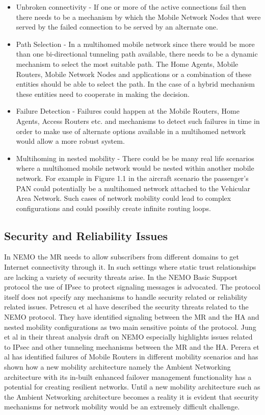 \begin{itemize}
\item Unbroken connectivity - If one or more of the active connections fail
then there needs to be a mechanism by which the Mobile Network Nodes that were
served by the failed connection to be served by an alternate one.

\item Path Selection - In a multihomed mobile network since there would be
more than one bi-directional tunneling path available, there needs to be a
dynamic mechanism to select the most suitable path. The Home Agents, Mobile
Routers, Mobile Network Nodes and applications or a combination of these
entities should be able to select the path. In the case of a hybrid mechanism
these entities need to cooperate in making the decision.

\item Failure Detection - Failures could happen at the Mobile Routers, Home
Agents, Access Routers etc. and mechanisms to detect such
failures in time in order to make use of alternate options available in a
multihomed network would allow a more robust system.

\item Multihoming in nested mobility - There could be be many real life
scenarios where a multihomed mobile network would be nested within another
mobile network. For example in Figure 1.1 in the aircraft scenario the passenger's
PAN could potentially be a multihomed network attached to the Vehicular Area Network. Such cases of network mobility could lead to complex configurations and could possibly create infinite routing loops.
\end{itemize}

\subsection{Security and Reliability Issues}

In NEMO the MR needs to allow subscribers from different domains to get
Internet connectivity through it. In such settings where static trust
relationships are lacking a variety of security threats arise. In the NEMO
Basic Support protocol the use of IPsec to protect signaling messages is
advocated. The protocol itself does not specify any mechanisms to handle
security related or reliability related issues. Petrescu et al \cite{18} have
described the security threats related to the NEMO protocol. They have
identified signaling between the MR and the HA and nested mobility
configurations as two main sensitive points of the protocol. Jung et al
\cite{19} in their threat analysis draft on NEMO especially highlights issues
related to IPsec and other tunneling mechanisms between the MR and the HA.
Perera et al \cite{20} has identified failures of Mobile Routers in different
mobility scenarios and has shown how a new mobility architecture namely the
Ambient Networking architecture \cite{21} with its in-built enhanced failover
management functionality has a potential for creating resilient networks.
Until a new mobility architecture such as the Ambient Networking architecture
becomes a reality it is evident that security mechanisms for network mobility
would be an extremely difficult challenge.

